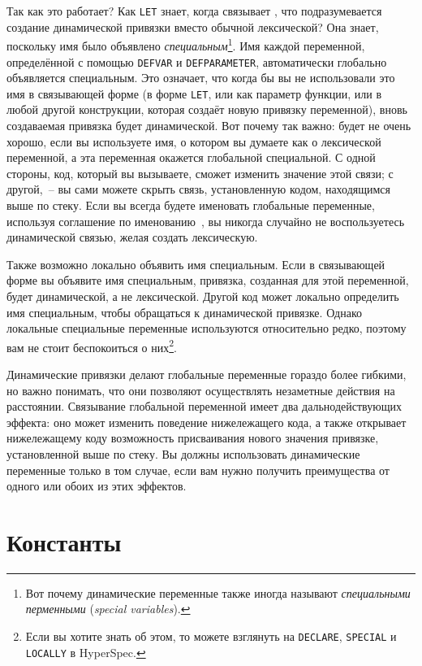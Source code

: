 Так как это работает? Как \lstinline{LET} знает, когда связывает , что
подразумевается создание динамической привязки вместо обычной лексической? Она знает,
поскольку имя было объявлено \textit{специальным}\footnote{Вот почему динамические
  переменные также иногда называют \textit{специальными перменными} (\textit{special
    variables}).}. Имя каждой переменной, определённой с помощью \lstinline{DEFVAR} и
\lstinline{DEFPARAMETER}, автоматически глобально объявляется специальным. Это означает,
что когда бы вы не использовали это имя в связывающей форме (в форме \lstinline{LET}, или
как параметр функции, или в любой другой конструкции, которая создаёт новую привязку
переменной), вновь создаваемая привязка будет динамической. Вот почему 
  так важно: будет не очень хорошо, если вы используете имя,
о котором вы думаете как о лексической переменной, а эта переменная окажется глобальной
специальной. С одной стороны, код, который вы вызываете, сможет изменить значение этой
связи; с другой,~-- вы сами можете скрыть связь, установленную кодом, находящимся выше по
стеку. Если вы всегда будете именовать глобальные переменные, используя соглашение по
именованию~\code{*}, вы никогда случайно не воспользуетесь динамической связью, желая создать
лексическую.

Также возможно локально объявить имя специальным. Если в связывающей форме вы объявите имя
специальным, привязка, созданная для этой переменной, будет динамической, а не
лексической. Другой код может локально определить имя специальным, чтобы обращаться к
динамической привязке. Однако локальные специальные переменные используются относительно
редко, поэтому вам не стоит беспокоиться о них\footnote{Если вы хотите знать об этом, то
  можете взглянуть на \lstinline{DECLARE}, \lstinline{SPECIAL} и \lstinline{LOCALLY} в HyperSpec.}.

Динамические привязки делают глобальные переменные гораздо более гибкими, но важно понимать,
что они позволяют осуществлять незаметные действия на расстоянии. Связывание глобальной
переменной имеет два дальнодействующих эффекта: оно может изменить поведение нижележащего кода,
а также открывает нижележащему коду возможность присваивания нового значения привязке,
установленной выше по стеку. Вы должны использовать динамические переменные только в том
случае, если вам нужно получить преимущества от одного или обоих из этих эффектов.

\section{Константы}

